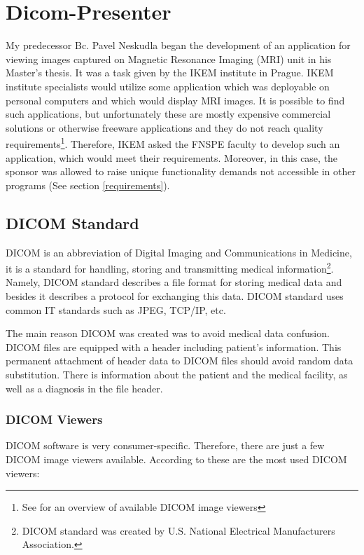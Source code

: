 \chapter{Dicom-Presenter}
\vspace{-10mm}
My predecessor Bc. Pavel Neskudla began the development of an application for viewing images captured on Magnetic Resonance Imaging (MRI) unit in his Master's thesis\cite{neskudla}. It was a task given by the IKEM institute in Prague. IKEM institute specialists would utilize some application which was deployable on personal computers and which would display MRI images. It is possible to find such applications, but unfortunately these are mostly expensive commercial solutions or otherwise freeware applications and they do not reach quality requirements\footnote{See \cite[page~9]{flaska_bc} for an overview of available DICOM image viewers}. Therefore, IKEM asked the FNSPE faculty to develop such an application, which would meet their requirements. Moreover, in this case, the sponsor was allowed to raise unique functionality demands not accessible in other programs (See section \ref{requirements}).

\section{DICOM Standard}

DICOM is an abbreviation of Digital Imaging and Communications in Medicine, it is a standard for handling, storing and transmitting medical information\footnote{DICOM standard was created by  U.S. National Electrical Manufacturers Association.}. Namely, DICOM standard describes a file format for storing medical data and besides it describes a protocol for exchanging this data. DICOM standard uses common IT standards such as JPEG, TCP/IP, etc. \cite{dicombook}

The main reason DICOM was created was to avoid medical data confusion. DICOM files are equipped with a header including patient's information. This permanent attachment of header data to DICOM files should avoid random data substitution. There is information about the patient and the medical facility, as well as a diagnosis in the file header.

\subsection{DICOM Viewers}
\label{viewers}
DICOM software is very consumer-specific. Therefore, there are just a few DICOM image viewers available. According to  these are the most used DICOM viewers:

